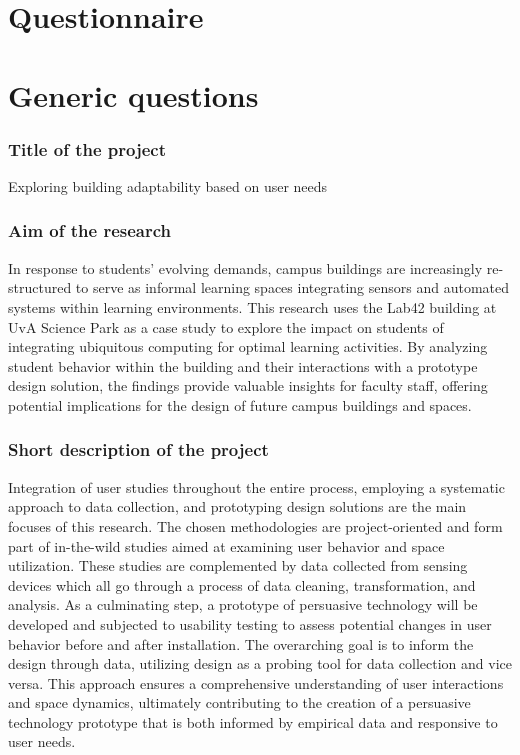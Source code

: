 \documentclass[a4paper]{article}
\begin{document}
\section*{Questionnaire}

\section{Generic questions}

\subsubsection{Title of the project}

Exploring building adaptability based on user needs

\subsubsection{Aim of the research}

In response to students’ evolving demands, campus buildings are increasingly re-structured to serve as informal learning spaces integrating sensors and automated systems within learning environments. This research uses the Lab42 building at UvA Science
Park as a case study to explore the impact on students of integrating ubiquitous computing for optimal learning activities. By analyzing student behavior within the building and their interactions with a prototype design solution, the findings provide valuable insights
for faculty staff, offering potential implications for the design of future campus buildings and spaces.

\subsubsection{Short description of the project}

Integration of user studies throughout the entire process, employing a systematic approach to data collection, and prototyping design solutions are the main focuses of this research. The chosen methodologies are project-oriented and form part of in-the-wild studies aimed at examining user behavior and space utilization. These studies are complemented by data collected from sensing devices which all go through a process of data cleaning, transformation, and analysis. As a culminating step, a prototype of persuasive technology will be developed and subjected to usability testing to assess potential changes in user behavior before and after installation. The overarching goal is to inform the design through data, utilizing design as a probing tool for data collection and vice versa. This approach ensures a comprehensive understanding of user interactions and space dynamics, ultimately contributing to the creation of a
persuasive technology prototype that is both informed by empirical data and responsive to user needs.
\end{document}
